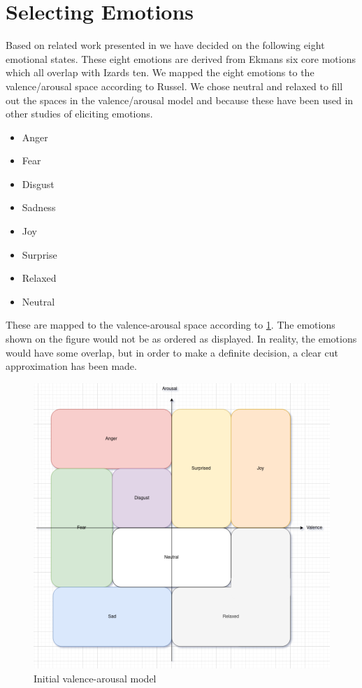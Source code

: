 \section{Selecting Emotions}\label{sec:selectingEmotion}
Based on related work presented in  we have decided on the following eight emotional states. These eight emotions are derived from Ekmans six core motions which all overlap with Izards ten. We mapped the eight emotions to the valence/arousal space according to Russel. We chose neutral and relaxed to fill out the spaces in the valence/arousal model and because these have been used in other studies of eliciting emotions.
\begin{itemize}
    \item Anger
    \item Fear
    \item Disgust
    \item Sadness
    \item Joy
    \item Surprise
    \item Relaxed
    \item Neutral
\end{itemize}
These are mapped to the valence-arousal space according to \cref{fig:VAinit}. The emotions shown on the figure would not be as ordered as displayed. In reality, the emotions would have some overlap, but in order to make a definite decision, a clear cut approximation has been made.

\begin{figure}[H]
    \centering
    \includegraphics[width=\textwidth]{figures/va16model.png}
    \caption{Initial valence-arousal model}
    \label{fig:VAinit}
\end{figure}

